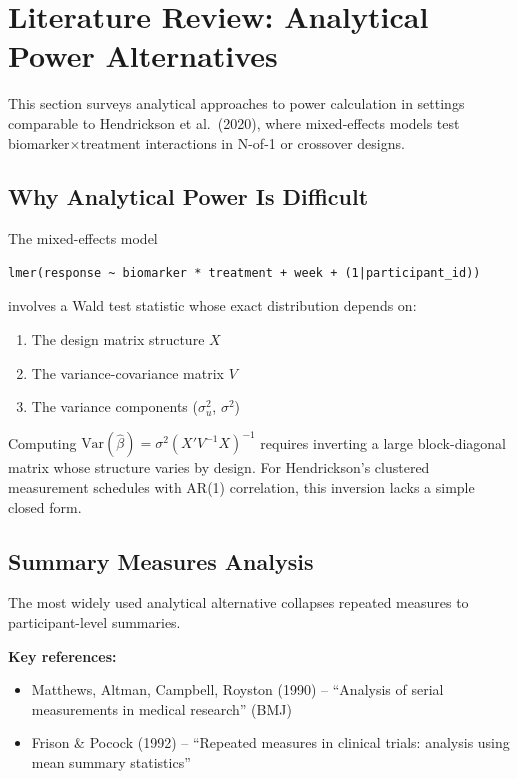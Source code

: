 \documentclass[11pt]{article}
\theoremstyle{definition}
\begin{document}
\section{Literature Review: Analytical Power Alternatives}

This section surveys analytical approaches to power calculation in settings
comparable to Hendrickson et al.\ (2020), where mixed-effects models test
biomarker$\times$treatment interactions in N-of-1 or crossover designs.

\subsection{Why Analytical Power Is Difficult}

The mixed-effects model
\begin{lstlisting}
lmer(response ~ biomarker * treatment + week + (1|participant_id))
\end{lstlisting}
involves a Wald test statistic whose exact distribution depends on:
\begin{enumerate}
    \item The design matrix structure $X$
    \item The variance-covariance matrix $V$
    \item The variance components ($\sigma_u^2$, $\sigma^2$)
\end{enumerate}

Computing $\text{Var}(\hat{\beta}) = \sigma^2(X'V^{-1}X)^{-1}$ requires inverting
a large block-diagonal matrix whose structure varies by design. For Hendrickson's
clustered measurement schedules with AR(1) correlation, this inversion lacks a
simple closed form.

\subsection{Summary Measures Analysis}

The most widely used analytical alternative collapses repeated measures to
participant-level summaries.

\textbf{Key references:}
\begin{itemize}
    \item Matthews, Altman, Campbell, Royston (1990) -- ``Analysis of serial
    measurements in medical research'' (BMJ)
    \item Frison \& Pocock (1992) -- ``Repeated measures in clinical trials:
    analysis using mean summary statistics''
\end{itemize}
\end{document}
